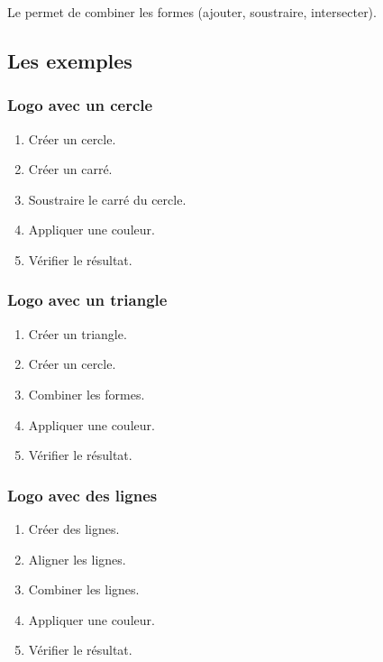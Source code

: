 Le  permet de combiner les formes (ajouter, soustraire, intersecter).

\subsection{Les exemples}

\subsubsection{Logo avec un cercle}

\begin{enumerate}
    \item Créer un cercle.
    \item Créer un carré.
    \item Soustraire le carré du cercle.
    \item Appliquer une couleur.
    \item Vérifier le résultat.
\end{enumerate}

\subsubsection{Logo avec un triangle}

\begin{enumerate}
    \item Créer un triangle.
    \item Créer un cercle.
    \item Combiner les formes.
    \item Appliquer une couleur.
    \item Vérifier le résultat.
\end{enumerate}

\subsubsection{Logo avec des lignes}

\begin{enumerate}
    \item Créer des lignes.
    \item Aligner les lignes.
    \item Combiner les lignes.
    \item Appliquer une couleur.
    \item Vérifier le résultat.
\end{enumerate}

